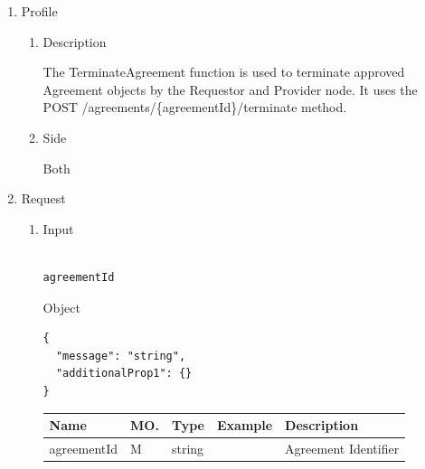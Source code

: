 \begin{enumerate}
\end{enumerate}

\newpage


\begin{enumerate}

\item Profile

\begin{enumerate}

\item Description

The TerminateAgreement function is used to terminate approved Agreement objects by the Requestor and Provider node. 
It uses the POST /agreements/\{agreementId\}/terminate method.

\item Side

Both

\end{enumerate}

\item Request

\begin{enumerate}

\item Input

\begin{tcolorbox}[boxrule=0pt, frame empty]
\begin{verbatim}

agreementId

\end{verbatim}
\end{tcolorbox}

Object
\begin{tcolorbox}[boxrule=0pt, frame empty]
\begin{verbatim}
{
  "message": "string",
  "additionalProp1": {}
}
\end{verbatim}
\end{tcolorbox}

\begin{table}[H]
\footnotesize

\begin{center}
\begin{tabular}{|p{3cm}|l|p{3cm}|p{3cm}|p{4cm}|} 
\hline
\rowcolor{lightgray}	Name	& MO.	& Type	& Example & 	Description \\
\hline

agreementId		& M & 	string				&		& 	Agreement Identifier \\
\hline


\end{tabular}
\end{center}
\end{table}
\end{enumerate}
\end{enumerate}
